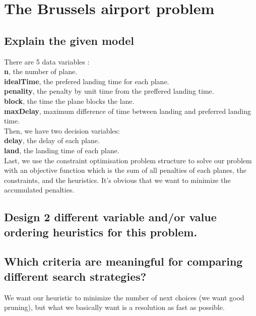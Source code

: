 \documentclass[a4paper ,12pt,french]{article}
\begin{document}
\tableofcontents %

\thispagestyle{fancy}

\pagebreak
\setcounter{page}{1}
\pagestyle{fancy} %

\section{The Brussels airport problem}

\subsection{Explain the given model}
There are 5 data variables :\\
\textbf{n}, the number of plane.\\
\textbf{idealTime}, the prefered landing time for each plane.\\
\textbf{penality}, the penalty by unit time from the preffered landing time.\\
\textbf{block}, the time the plane blocks the lane.\\
\textbf{maxDelay}, maximum difference of time between landing and preferred landing time.\\

Then, we have two decision variables:\\
\textbf{delay}, the delay of each plane.\\
\textbf{land}, the landing time of each plane.\\

Last, we use the constraint optimisation problem structure to solve our problem with an objective function which is the sum of all penalties of each planes, the constraints, and the heuristics.
It's obvious that we want to minimize the accumulated penalties.

\subsection{Design 2 different variable and/or value ordering heuristics for this problem.}

\subsection{Which criteria are meaningful for comparing different search strategies?}
We want our heuristic to minimize the number of next choices (we want good pruning), but what we basically want is a resolution as fast as possible.
\end{document}
